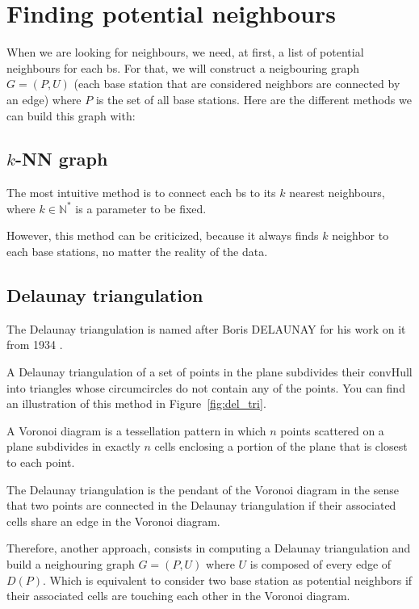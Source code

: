 \documentclass[lettersize,journal,english]{IEEEtran}
\begin{document}
\section{Finding potential neighbours}
\noindent When we are looking for neighbours, we need, at first, a list of potential neighbours for each \acrfull{bs}.
For that, we will construct a neigbouring graph $G = (P, U)$ (each base station that are considered neighbors are
connected by an edge) where $P$ is the set of all base stations. 
Here are the different methods we can build this graph with:

\subsection{$k$-NN graph}
\noindent The most intuitive method is to connect each \acrshort{bs} to its $k$ nearest neighbours, where $k \in \mathbb{N}^*$ 
is a parameter to be fixed. 

However, this method can be criticized, because it always finds $k$ neighbor to each base stations, no matter the reality of the 
data.

\subsection{Delaunay triangulation}
\noindent The Delaunay triangulation is named after Boris DELAUNAY for his work on it from 1934 \cite{art_delaunay}.

A Delaunay triangulation of a set of points in the plane subdivides their \gls{convHull} into triangles whose circumcircles 
do not contain any of the points. You can find an illustration of this method in Figure~\ref{fig:del_tri}.

A Voronoi diagram is a tessellation pattern in which $n$ points scattered on a plane subdivides in 
exactly $n$ cells enclosing a portion of the plane that is closest to each point. 

The Delaunay triangulation is the pendant of the Voronoi diagram in the sense that two points are connected in the
Delaunay triangulation if their associated cells share an edge in the Voronoi diagram. 

Therefore, another approach, consists in computing a Delaunay triangulation and build a neighouring graph $G = (P, U)$ where $U$ 
is composed of every edge of $D(P)$. Which is equivalent to consider two base station as potential neighbors if their associated
cells are touching each other in the Voronoi diagram.
\end{document}

